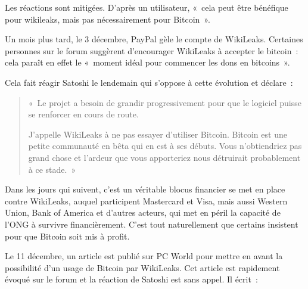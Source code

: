 Les réactions sont mitigées. D'après un utilisateur, «~cela peut être bénéfique pour wikileaks, mais pas nécessairement pour Bitcoin~».

Un mois plus tard, le 3 décembre, PayPal gèle le compte de WikiLeaks. Certaines personnes sur le forum suggèrent d'encourager WikiLeaks à accepter le bitcoin~: cela paraît en effet le «~moment idéal pour commencer les dons en bitcoins~».

Cela fait réagir Satoshi le lendemain qui s'oppose à cette évolution et déclare~:

\begin{quote}
«~Le projet a besoin de grandir progressivement pour que le logiciel puisse se renforcer en cours de route.

J'appelle WikiLeaks à ne pas essayer d'utiliser Bitcoin. Bitcoin est une petite communauté en bêta qui en est à ses débuts. Vous n'obtiendriez pas grand chose et l'ardeur que vous apporteriez nous détruirait probablement à ce stade.~»
\end{quote}

Dans les jours qui suivent, c'est un véritable blocus financier se met en place contre WikiLeaks, auquel participent Mastercard et Visa, mais aussi Western Union, Bank of America et d'autres acteurs, qui met en péril la capacité de l'ONG à survivre financièrement. C'est tout naturellement que certains insistent pour que Bitcoin soit mis à profit.

Le 11 décembre, un article est publié sur PC World pour mettre en avant la possibilité d'un usage de Bitcoin par WikiLeaks. Cet article est rapidement évoqué sur le forum et la réaction de Satoshi est sans appel. Il écrit~: 


